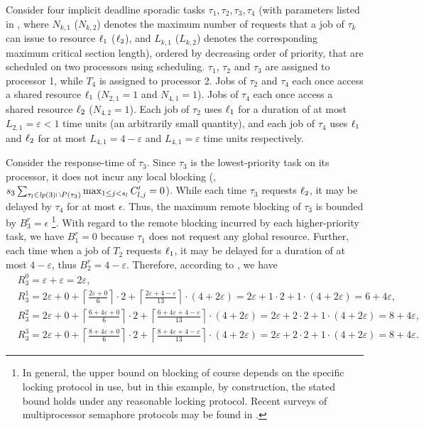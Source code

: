 Consider four implicit deadline sporadic tasks ${\tau_1, \tau_2, \tau_3, \tau_4}$ (with parameters listed in , where $N_{k,1}$ ($N_{k,2}$) denotes the maximum number of requests that a job of $\tau_k$ can issue to resource $\ell_1$ ($\ell_2$), and $L_{k,1}$ ($L_{k,2}$) denotes the corresponding maximum critical section length), ordered by decreasing order of priority, that are scheduled on two processors using \pfp scheduling. $\tau_1$, $\tau_2$ and $\tau_3$ are assigned to processor 1, while $T_4$ is assigned to processor 2. Jobs of $\tau_2$ and $\tau_4$   each once access a shared resource $\ell_1$  ($N_{2,1} = 1$ and $N_{4,1} = 1$). Jobs of $\tau_4$ each once access a shared resource $\ell_2$ ($N_{4,2} = 1$). Each job of $\tau_2$ uses $\ell_1$ for a duration of at most $L_{2,1} = \varepsilon < 1$ time units (an arbitrarily small quantity), and each job of $\tau_4$ uses $\ell_1$ and $\ell_2$ for at most $L_{4,1} = 4-\varepsilon$ and $L_{4,1} = \varepsilon$ time units respectively. 

Consider the response-time of $\tau_3$. Since $\tau_3$ is the lowest-priority task on its processor, it does not incur any local blocking (\ie,$s_3 \sum_{\tau_l \in \mathit{lp}(3) \cap P(\tau_3)} \max_{1 \leq j < s_l} C_{l,j}^{\prime} = 0$). While each time $\tau_3$ requests $\ell_2$, it may be delayed by $\tau_4$ for at most $\epsilon$. Thus, the maximum remote blocking of $\tau_3$ is bounded by $B_3^r = \epsilon$ \footnote{In general, the upper bound on blocking of course depends on the specific locking protocol in use, but in this example, by construction, the stated bound holds under any reasonable locking protocol. Recent surveys of multiprocessor semaphore protocols may be found in \cite{bbb-2013,yang-2015}.}. With regard to the remote blocking incurred by each higher-priority task, we have $B_1^r = 0$ because $\tau_1$ does not request any global resource. Further, each time when a job of $T_2$ requests $\ell_1$, it may be delayed for a duration of at most $4-\varepsilon$, thus $B_2^r = 4-\varepsilon$. Therefore, according to , we have
\begin{align*}
& R_3^0 = \varepsilon + \varepsilon = 2\varepsilon, \\
& R_3^1 = 2\varepsilon + 0 + \left \lceil \frac{2\varepsilon + 0}{6} \right \rceil \cdot 2 + \left \lceil \frac{2\varepsilon + 4 - \varepsilon}{13} \right \rceil \cdot (4+2\varepsilon) = 2\varepsilon + 1 \cdot 2 + 1 \cdot (4+2\varepsilon) = 6+4\varepsilon, \\
& R_3^2 = 2\varepsilon + 0 + \left \lceil \frac{6+4\varepsilon + 0}{6} \right \rceil \cdot 2 + \left \lceil \frac{6+4\varepsilon + 4-\varepsilon}{13} \right \rceil \cdot (4+2\varepsilon) = 2\varepsilon + 2 \cdot 2 + 1 \cdot (4+2\varepsilon) = 8+4\varepsilon, \\
& R_3^3 = 2\varepsilon + 0 + \left \lceil \frac{8+4\varepsilon + 0}{6} \right \rceil \cdot 2 + \left \lceil \frac{8+4\varepsilon + 4-\varepsilon}{13} \right \rceil \cdot (4+2\varepsilon) = 2\varepsilon + 2 \cdot 2 + 1 \cdot (4+2\varepsilon) = 8+4\varepsilon.
\end{align*}
 
